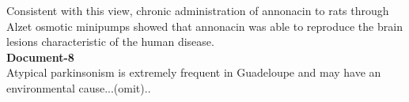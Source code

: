 \documentclass[10pt, a4paper, logo]{googledeepmind} %
\begin{document}
\begin{tcolorbox}
\begin{flushleft}
Consistent with this view, chronic administration of annonacin to rats through Alzet osmotic minipumps showed that annonacin was able to reproduce the brain lesions characteristic of the human disease.
\\
\vspace{1em}
\textbf{Document-8}
\\
Atypical parkinsonism is extremely frequent in Guadeloupe and may have an environmental cause...(omit)..

\end{flushleft}
\end{tcolorbox}
\end{document}
